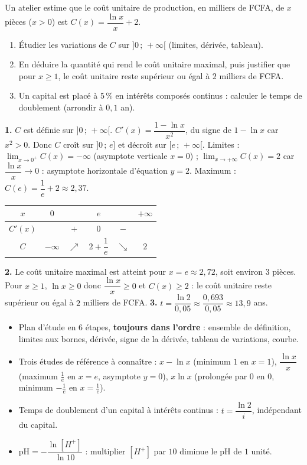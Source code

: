 \documentclass[11pt]{article}
\begin{document}
\begin{exercice}
Un atelier estime que le coût unitaire de production, en milliers de FCFA, de $x$ pièces ($x>0$) est $C(x)=\dfrac{\ln x}{x}+2$.
\begin{enumerate}
\item Étudier les variations de $C$ sur $]0\,;\,+\infty[$ (limites, dérivée, tableau).
\item En déduire la quantité qui rend le coût unitaire maximal, puis justifier que pour $x\geq 1$, le coût unitaire reste supérieur ou égal à $2$ milliers de FCFA.
\item Un capital est placé à $5\,\%$ en intérêts composés continus : calculer le temps de doublement (arrondir à $0,1$ an).
\end{enumerate}
\end{exercice}

\begin{corrige}
\textbf{1.} $C$ est définie sur $]0\,;\,+\infty[$. $C'(x)=\dfrac{1-\ln x}{x^2}$, du signe de $1-\ln x$ car $x^2>0$. Donc $C$ croît sur $]0\,;\,e]$ et décroît sur $[e\,;\,+\infty[$. Limites : $\lim_{x\to 0^+}C(x)=-\infty$ (asymptote verticale $x=0$) ; $\lim_{x\to+\infty}C(x)=2$ car $\dfrac{\ln x}{x}\to 0$ : asymptote horizontale d'équation $y=2$. Maximum : $C(e)=\dfrac{1}{e}+2\approx 2,37$.
\begin{center}
\begin{tabular}{|c|ccccc|}\hline
$x$ & $0$ & & $e$ & & $+\infty$ \\ \hline
$C'(x)$ & & $+$ & $0$ & $-$ & \\ \hline
$C$ & $-\infty$ & $\nearrow$ & $2+\dfrac{1}{e}$ & $\searrow$ & $2$ \\ \hline
\end{tabular}
\end{center}
\textbf{2.} Le coût unitaire maximal est atteint pour $x=e\approx 2,72$, soit environ $3$ pièces. Pour $x\geq 1$, $\ln x\geq 0$ donc $\dfrac{\ln x}{x}\geq 0$ et $C(x)\geq 2$ : le coût unitaire reste supérieur ou égal à $2$ milliers de FCFA.
\textbf{3.} $t=\dfrac{\ln 2}{0,05}\approx\dfrac{0,693}{0,05}\approx 13,9$ ans.
\end{corrige}

\begin{aretenir}
\begin{itemize}
\item Plan d'étude en 6 étapes, \textbf{toujours dans l'ordre} : ensemble de définition, limites aux bornes, dérivée, signe de la dérivée, tableau de variations, courbe.
\item Trois études de référence à connaître : $x-\ln x$ (minimum $1$ en $x=1$), $\dfrac{\ln x}{x}$ (maximum $\frac{1}{e}$ en $x=e$, asymptote $y=0$), $x\ln x$ (prolongée par $0$ en $0$, minimum $-\frac{1}{e}$ en $x=\frac{1}{e}$).
\item Temps de doublement d'un capital à intérêts continus : $t=\dfrac{\ln 2}{i}$, indépendant du capital.
\item $\mathrm{pH}=-\dfrac{\ln[H^+]}{\ln 10}$ : multiplier $[H^+]$ par $10$ diminue le pH de $1$ unité.
\end{itemize}
\end{aretenir}
\end{document}
